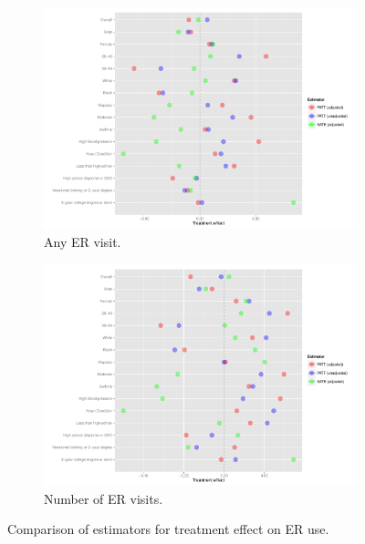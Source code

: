 \documentclass[12pt]{article}
\begin{document}
\begin{figure}
\begin{center}
  \begin{subfigure}[b]{0.86\textwidth}
    \includegraphics[width=\textwidth]{any-visit-plot.pdf}
    \caption{Any ER visit.}
    \label{fig:any-visit-plot}
  \end{subfigure}
  \begin{subfigure}[b]{0.86\textwidth}
    \includegraphics[width=\textwidth]{num-visit-plot.pdf}
    \caption{Number of ER visits.}
    \label{fig:num-visit-plot}
  \end{subfigure}
 \caption{Comparison of estimators for treatment effect on ER use.}
  \end{center}
 \label{fig:ER-visit}
\end{figure}
\end{document}
